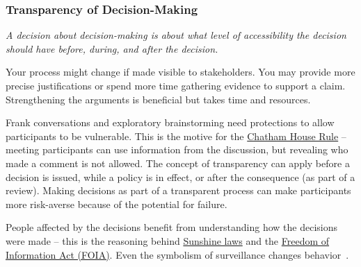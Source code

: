 \subsubsection*{Transparency of Decision-Making\label{sec:transparency-of-decisions}}

\textit{A decision about decision-making is about what level of accessibility the decision should have before, during, and after the decision.}


Your %
process might change if made visible to stakeholders. You may provide more precise justifications or spend more time gathering evidence to support a claim. Strengthening the arguments is beneficial but takes time and resources. 

Frank conversations and exploratory brainstorming need protections to allow participants to be vulnerable. 
This is the motive for the \href{https://en.wikipedia.org/wiki/Chatham_House_Rule}{Chatham House Rule} -- meeting participants can use information from the discussion, but revealing who made a comment is not allowed.
\iftoggle{WPinmargin}{\marginpar{$>$Wikipedia: Chatham House Rule}}{}
The concept of transparency can apply before a decision is issued, while a policy is in effect, or after the consequence (as part of a review). 
Making decisions as part of a transparent process can make participants more risk-averse because of the potential for failure.

People affected by the decisions benefit from understanding how the decisions were made -- this is the reasoning behind  
\href{https://en.wikipedia.org/wiki/Government_in_the_Sunshine_Act}{Sunshine laws} and the 
\href{https://en.wikipedia.org/wiki/Freedom_of_Information_Act_(United_States)}{Freedom of Information Act (FOIA)}. 
\iftoggle{WPinmargin}{\marginpar{$>$Wikipedia: Freedom of Information Act}}{}
Even the symbolism of surveillance changes behavior~\cite{2005_Haley, 2007_Burnham}.




